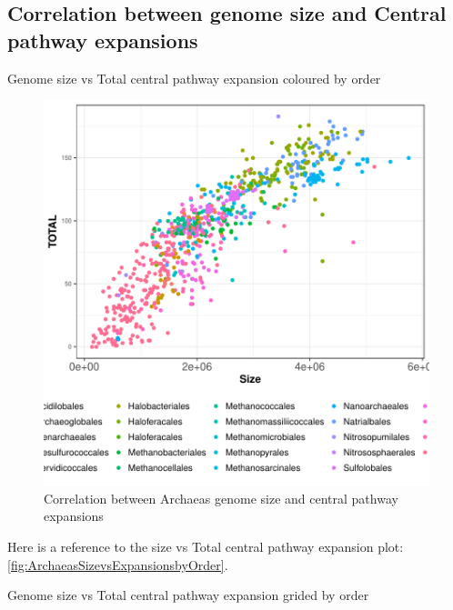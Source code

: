 \documentclass[12pt,twoside]{reedthesis}
\begin{document}
  \subsection{Correlation between genome size and Central pathway
  expansions}\label{correlation-between-genome-size-and-central-pathway-expansions}
  
  Genome size vs Total central pathway expansion coloured by order
  
  \begin{figure}[h!tbp]
  \centering
  \includegraphics[angle = 0,scale = 1]{chapter3/ArchaeasSizevsExpansionsbyOrder.pdf}
  \caption[Correlation between Archaeas genome size and central pathway expansions ]{\normalsize{Correlation between Archaeas genome size and central pathway expansions }}
  \label{fig:ArchaeasSizevsExpansionsbyOrder}
  \end{figure}
  
  Here is a reference to the size vs Total central pathway expansion plot:
  \autoref{fig:ArchaeasSizevsExpansionsbyOrder}. \clearpage 
  
  Genome size vs Total central pathway expansion grided by order
  
\end{document}
